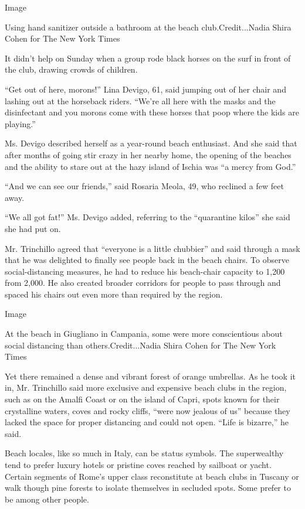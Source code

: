 Image

Using hand sanitizer outside a bathroom at the beach club.Credit...Nadia
Shira Cohen for The New York Times

It didn't help on Sunday when a group rode black horses on the surf in
front of the club, drawing crowds of children.

``Get out of here, morons!'' Lina Devigo, 61, said jumping out of her
chair and lashing out at the horseback riders. ``We're all here with the
masks and the disinfectant and you morons come with these horses that
poop where the kids are playing.''

Ms. Devigo described herself as a year-round beach enthusiast. And she
said that after months of going stir crazy in her nearby home, the
opening of the beaches and the ability to stare out at the hazy island
of Ischia was ``a mercy from God.''

``And we can see our friends,'' said Rosaria Meola, 49, who reclined a
few feet away.

``We all got fat!'' Ms. Devigo added, referring to the ``quarantine
kilos'' she said she had put on.

Mr. Trinchillo agreed that ``everyone is a little chubbier'' and said
through a mask that he was delighted to finally see people back in the
beach chairs. To observe social-distancing measures, he had to reduce
his beach-chair capacity to 1,200 from 2,000. He also created broader
corridors for people to pass through and spaced his chairs out even more
than required by the region.

Image

At the beach in Giugliano in Campania, some were more conscientious
about social distancing than others.Credit...Nadia Shira Cohen for The
New York Times

Yet there remained a dense and vibrant forest of orange umbrellas. As he
took it in, Mr. Trinchillo said more exclusive and expensive beach clubs
in the region, such as on the Amalfi Coast or on the island of Capri,
spots known for their crystalline waters, coves and rocky cliffs, ``were
now jealous of us'' because they lacked the space for proper distancing
and could not open. ``Life is bizarre,'' he said.

Beach locales, like so much in Italy, can be status symbols. The
superwealthy tend to prefer luxury hotels or pristine coves reached by
sailboat or yacht. Certain segments of Rome's upper class reconstitute
at beach clubs in Tuscany or walk though pine forests to isolate
themselves in secluded spots. Some prefer to be among other people.

